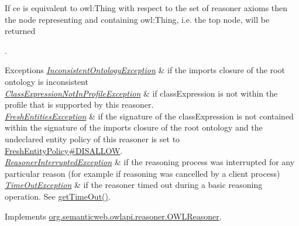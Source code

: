 If {\ttfamily ce} is equivalent to {\ttfamily owl\-:Thing} with respect to the set of reasoner axioms then the node representing and containing {\ttfamily owl\-:Thing}, i.\-e. the top node, will be returned 

.


\begin{DoxyExceptions}{Exceptions}
{\em \hyperlink{classorg_1_1semanticweb_1_1owlapi_1_1reasoner_1_1_inconsistent_ontology_exception}{Inconsistent\-Ontology\-Exception}} & if the imports closure of the root ontology is inconsistent \\
\hline
{\em \hyperlink{classorg_1_1semanticweb_1_1owlapi_1_1reasoner_1_1_class_expression_not_in_profile_exception}{Class\-Expression\-Not\-In\-Profile\-Exception}} & if {\ttfamily class\-Expression} is not within the profile that is supported by this reasoner. \\
\hline
{\em \hyperlink{classorg_1_1semanticweb_1_1owlapi_1_1reasoner_1_1_fresh_entities_exception}{Fresh\-Entities\-Exception}} & if the signature of the class\-Expression is not contained within the signature of the imports closure of the root ontology and the undeclared entity policy of this reasoner is set to \hyperlink{enumorg_1_1semanticweb_1_1owlapi_1_1reasoner_1_1_fresh_entity_policy_a762eae6d5b2449d125311ecaabfdc8d0}{Fresh\-Entity\-Policy\#\-D\-I\-S\-A\-L\-L\-O\-W}. \\
\hline
{\em \hyperlink{classorg_1_1semanticweb_1_1owlapi_1_1reasoner_1_1_reasoner_interrupted_exception}{Reasoner\-Interrupted\-Exception}} & if the reasoning process was interrupted for any particular reason (for example if reasoning was cancelled by a client process) \\
\hline
{\em \hyperlink{classorg_1_1semanticweb_1_1owlapi_1_1reasoner_1_1_time_out_exception}{Time\-Out\-Exception}} & if the reasoner timed out during a basic reasoning operation. See \hyperlink{classorg_1_1semanticweb_1_1owlapi_1_1reasoner_1_1impl_1_1_o_w_l_reasoner_base_af55342eaaabb1b72dacfde7a181b93d2}{get\-Time\-Out()}. \\
\hline
\end{DoxyExceptions}


Implements \hyperlink{interfaceorg_1_1semanticweb_1_1owlapi_1_1reasoner_1_1_o_w_l_reasoner_afb7eb24f8c48371c8903a617a185929c}{org.\-semanticweb.\-owlapi.\-reasoner.\-O\-W\-L\-Reasoner}.


